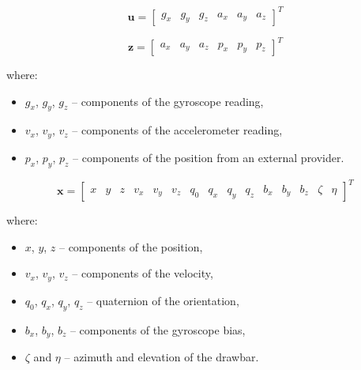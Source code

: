 \begin{equation}
	\bm{u} = \begin{bmatrix}
		g_x & g_y & g_z & a_x & a_y & a_z
	\end{bmatrix}^T
	\label{u_vec}
\end{equation}

\begin{equation}
	\bm{z} = \begin{bmatrix}
		a_x & a_y & a_z & p_x & p_y & p_z
	\end{bmatrix}^T
	\label{h_vec}
\end{equation}

where:
\begin{itemize}[topsep=0pt]
	\item $g_x$, $g_y$, $g_z$ -- components of the gyroscope reading,
	\item $v_x$, $v_y$, $v_z$ -- components of the accelerometer reading,
	\item $p_x$, $p_y$, $p_z$ -- components of the position from an external provider.
\end{itemize}

\begin{equation}
	\bm{x} = \begin{bmatrix}
	x & y & z & v_x & v_y & v_z & q_0 & q_x & q_y & q_z & b_x & b_y & b_z & \zeta & \eta
	\end{bmatrix}^T
	\label{state_vec}
\end{equation}

where:
\begin{itemize}[topsep=0pt]
	\item $x$, $y$, $z$ -- components of the position,
	\item $v_x$, $v_y$, $v_z$ -- components of the velocity,
	\item $q_0$, $q_x$, $q_y$, $q_z$ -- quaternion of the orientation,
	\item $b_x$, $b_y$, $b_z$ -- components of the gyroscope bias,
	\item $\zeta$ and $\eta$ -- azimuth and elevation of the drawbar.
\end{itemize}
\hspace{1pt}

